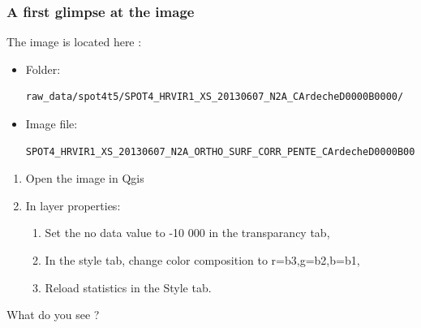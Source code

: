 \documentclass[8pt]{beamer}
\begin{document}
\begin{frame}[fragile]

\frametitle{A first glimpse at the image}

The image is located here :
\begin{scriptsize}
\begin{itemize}
\item Folder: \begin{verbatim}raw_data/spot4t5/SPOT4_HRVIR1_XS_20130607_N2A_CArdecheD0000B0000/\end{verbatim}
\item Image file: \begin{verbatim}SPOT4_HRVIR1_XS_20130607_N2A_ORTHO_SURF_CORR_PENTE_CArdecheD0000B0000.TIF\end{verbatim}
\end{itemize}
\end{scriptsize}

\begin{enumerate}
\item Open the image in Qgis
\item In layer properties:
  \begin{enumerate}
    \item Set the no data value to -10 000 in the transparancy tab,
    \item In the style tab, change color composition to r=b3,g=b2,b=b1,
    \item Reload statistics in the Style tab.
  \end{enumerate}
\end{enumerate}
What do you see ?
\end{frame}
\end{document}

